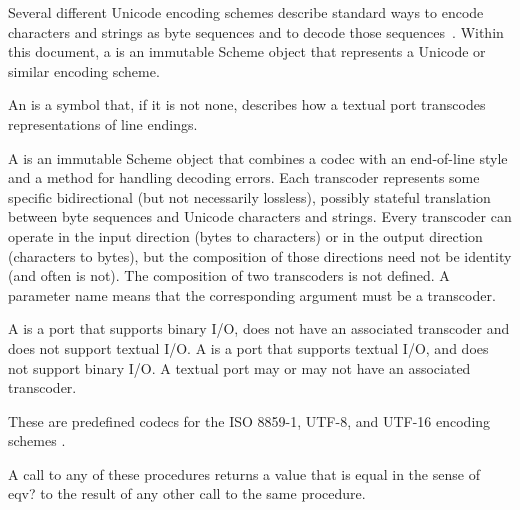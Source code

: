 Several different Unicode encoding schemes describe standard ways to
encode characters and strings as byte sequences and to decode those
sequences~\cite{Unicode}.
Within this document, a  is an immutable Scheme
object that represents a Unicode or similar encoding scheme.

An  is a symbol that, if it is not {\cf
  none}, describes how a textual port transcodes representations of
line endings.

A  is an immutable Scheme object that combines
a codec with an end-of-line style and a method for handling
decoding errors.
Each transcoder represents some specific bidirectional (but not
necessarily lossless), possibly stateful translation between byte
sequences and Unicode characters and strings.
Every transcoder can operate in the input direction (bytes to characters)
or in the output direction (characters to bytes),
but the composition of those directions need not be identity (and
often is not).  The composition of two transcoders is not defined.
A  parameter name means that the corresponding
argument must be a transcoder.

A  is a port that supports binary I/O, does not
have an associated transcoder and does not support textual I/O.  A
 is a port that supports textual I/O, and does
not support binary I/O.  A textual port may or may not have an
associated transcoder.

\begin{entry}{%
}

These are predefined codecs for the ISO 8859-1, UTF-8,
and UTF-16 encoding schemes \cite{Unicode}.

A call to any of these procedures returns a value that is equal in the
sense of {\cf eqv?} to the result of any other call to the same
procedure.
\end{entry}

